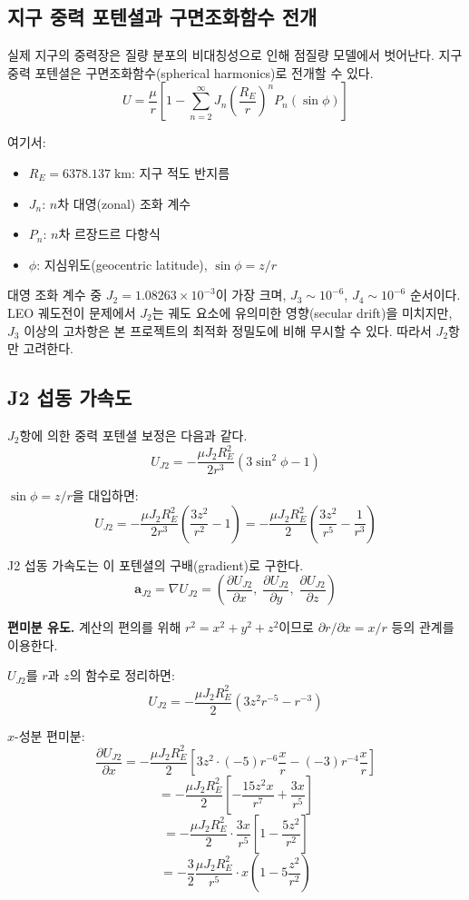\documentclass[11pt]{article}
\begin{document}
\subsection{지구 중력 포텐셜과 구면조화함수 전개}

실제 지구의 중력장은 질량 분포의 비대칭성으로 인해 점질량 모델에서 벗어난다. 지구 중력 포텐셜은 구면조화함수(spherical harmonics)로 전개할 수 있다.
\[
U = \frac{\mu}{r}\left[1 - \sum_{n=2}^{\infty} J_n \left(\frac{R_E}{r}\right)^n P_n(\sin\phi)\right]
\]

여기서:
\begin{itemize}
  \item $R_E = 6378.137\;\text{km}$: 지구 적도 반지름
  \item $J_n$: $n$차 대영(zonal) 조화 계수
  \item $P_n$: $n$차 르장드르 다항식
  \item $\phi$: 지심위도(geocentric latitude), $\sin\phi = z/r$
\end{itemize}

대영 조화 계수 중 $J_2 = 1.08263 \times 10^{-3}$이 가장 크며, $J_3 \sim 10^{-6}$, $J_4 \sim 10^{-6}$ 순서이다. LEO 궤도전이 문제에서 $J_2$는 궤도 요소에 유의미한 영향(secular drift)을 미치지만, $J_3$ 이상의 고차항은 본 프로젝트의 최적화 정밀도에 비해 무시할 수 있다. 따라서 $J_2$항만 고려한다.


\subsection{J2 섭동 가속도}

$J_2$항에 의한 중력 포텐셜 보정은 다음과 같다.
\[
U_{J2} = -\frac{\mu J_2 R_E^2}{2r^3}\left(3\sin^2\phi - 1\right)
\]

$\sin\phi = z/r$을 대입하면:
\[
U_{J2} = -\frac{\mu J_2 R_E^2}{2r^3}\left(\frac{3z^2}{r^2} - 1\right) = -\frac{\mu J_2 R_E^2}{2}\left(\frac{3z^2}{r^5} - \frac{1}{r^3}\right)
\]

J2 섭동 가속도는 이 포텐셜의 구배(gradient)로 구한다.
\[
\mathbf{a}_{J2} = \nabla U_{J2} = \left(\frac{\partial U_{J2}}{\partial x},\;\frac{\partial U_{J2}}{\partial y},\;\frac{\partial U_{J2}}{\partial z}\right)
\]

\textbf{편미분 유도.} 계산의 편의를 위해 $r^2 = x^2 + y^2 + z^2$이므로 $\partial r/\partial x = x/r$ 등의 관계를 이용한다.

$U_{J2}$를 $r$과 $z$의 함수로 정리하면:
\[
U_{J2} = -\frac{\mu J_2 R_E^2}{2}\left(3z^2 r^{-5} - r^{-3}\right)
\]

$x$-성분 편미분:
\[
\frac{\partial U_{J2}}{\partial x} = -\frac{\mu J_2 R_E^2}{2}\left[3z^2 \cdot (-5) r^{-6}\frac{x}{r} - (-3)r^{-4}\frac{x}{r}\right]
\]
\[
= -\frac{\mu J_2 R_E^2}{2}\left[-\frac{15z^2 x}{r^7} + \frac{3x}{r^5}\right]
\]
\[
= -\frac{\mu J_2 R_E^2}{2}\cdot\frac{3x}{r^5}\left[1 - \frac{5z^2}{r^2}\right]
\]
\[
= -\frac{3}{2}\frac{\mu J_2 R_E^2}{r^5}\cdot x\left(1 - 5\frac{z^2}{r^2}\right)
\]
\end{document}
